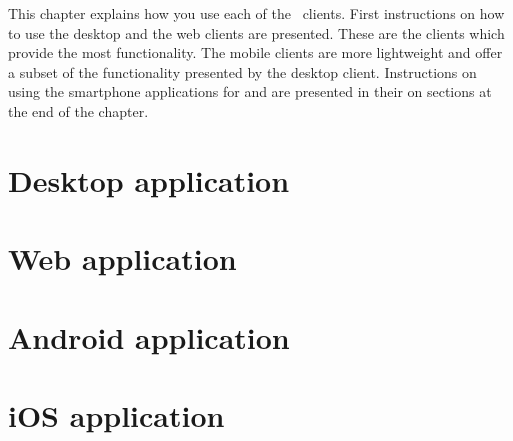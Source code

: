 

This chapter explains how you use each of the \appName\ clients. First instructions on how to use the desktop and the web clients are presented. These are the clients which provide the most functionality. The mobile clients are more lightweight and offer a subset of the functionality presented by the desktop client. Instructions on using the smartphone applications for  and  are presented in their on sections at the end of the chapter. 


\section{Desktop application}

\FloatBarrier

\section{Web application}

\FloatBarrier

\section{Android application}


\FloatBarrier

\section{iOS application}


\FloatBarrier
